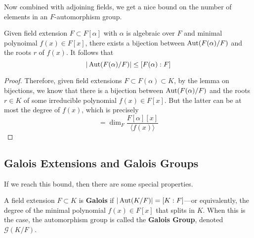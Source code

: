   Now combined with adjoining fields, we get a nice bound on the number of elements in an $F$-automorphism group. 

  \begin{corollary}
    Given field extension $F \subset F[\alpha]$ with $\alpha$ is algebraic over $F$ and minimal polynoimal $f(x) \in F[x]$, there exists a bijection between $\Aut(F(\alpha)/F)$ and the roots $r$ of $f(x)$. It follows that 
    \begin{equation}
      |\Aut(F(\alpha)/F)| \leq [F(\alpha):F]
    \end{equation}
  \end{corollary}
  \begin{proof}
    Therefore, given field extensions $F \subset F(\alpha) \subset K$, by the lemma on bijections, we know that there is a bijection between $\Aut(F(\alpha)/F)$ and the roots $r \in K$ of some irreducible polynomial $f(x) \in F[x]$. But the latter can be at most the degree of $f(x)$, which is precisely 
    \begin{equation}
      [F(\alpha):F] = \dim_F \frac{F[\alpha][x]}{\langle f(x) \rangle}
    \end{equation}
  \end{proof}

\subsection{Galois Extensions and Galois Groups}

  If we reach this bound, then there are some special properties. 

  \begin{definition}
    A field extension $F \subset K$ is \textbf{Galois} if $|\Aut(K/F)| = [K:F]$---or equivalently, the degree of the minimal polynomial $f(x) \in F[x]$ that splits in $K$. When this is the case, the automorphism group is called the \textbf{Galois Group}, denoted $\mathcal{G}(K/F)$. 
  \end{definition}

